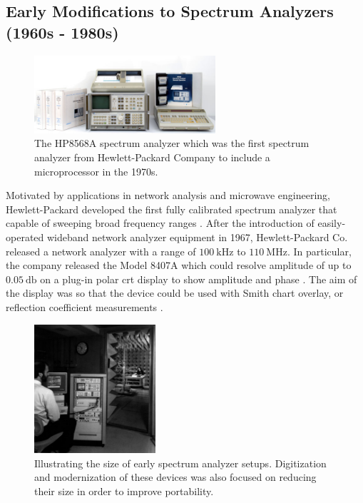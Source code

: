\documentclass[class=report,11pt,crop=false]{standalone}
\begin{document}
\subsection{Early Modifications to Spectrum Analyzers (1960s - 1980s)}

\begin{figure}
	\centering
	\includegraphics[width=0.60\textwidth]{Figures/Literature_Review/hp8568a}
	\caption{The HP8568A spectrum analyzer which was the first spectrum analyzer from Hewlett-Packard Company to include a microprocessor in the 1970s.}
	\label{fig:hp8568a}
\end{figure}

Motivated by applications in network analysis and microwave engineering, Hewlett-Packard developed the first fully calibrated spectrum analyzer that capable of sweeping broad frequency ranges \cite{adam1984microwave}. After the introduction of easily-operated wideband network analyzer equipment in 1967, Hewlett-Packard Co. released a network analyzer with a range of $\SI{100}{\kilo\hertz}$ to $\SI{110}{\mega\hertz}$. In particular, the company released the Model 8407A which could resolve amplitude of up to $\SI{0.05}{\decibel}$ on a plug-in polar \acrfull{crt} display to show amplitude and phase \cite{rytandnetwork1969}. The aim of the display was so that the device could be used with Smith chart overlay, or reflection coefficient measurements \cite{rytandnetwork1969}. 

\begin{figure}
	\centering
	\includegraphics[width=0.40\textwidth]{Figures/Literature_Review/hp8566-large}
	\caption{Illustrating the size of early spectrum analyzer setups. Digitization and modernization of these devices was also focused on reducing their size in order to improve portability.}
	\label{fig:hp56xx-large}
\end{figure} 
\end{document}
